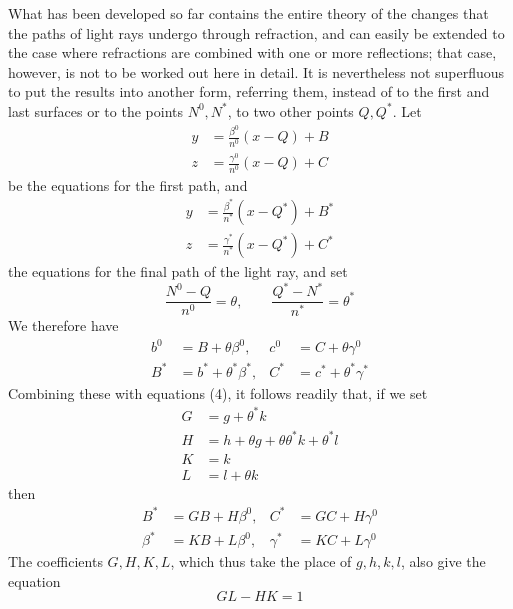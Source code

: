 What has been developed so far contains the entire theory of the changes that the paths of light rays undergo through refraction, and can easily be extended to the case where refractions are combined with one or more reflections; that case, however, is not to be worked out here in detail. It is nevertheless not superfluous to put the results into another form, referring them, instead of to the first and last surfaces or to the points $N^0,N^*$, to two other points $Q,Q^*$. Let
\[
\begin{aligned}
y&=\frac{\beta^0}{n^0}(x-Q)+B\\
z&=\frac{\gamma^0}{n^0}(x-Q)+C
\end{aligned}
\]
be the equations for the first path, and
\[
\begin{aligned}
y&=\frac{\beta^*}{n^*}(x-Q^*)+B^*\\
z&=\frac{\gamma^*}{n^*}(x-Q^*)+C^*
\end{aligned}
\]
the equations for the final path of the light ray, and set
\[
\frac{N^0-Q}{n^0}=\theta,\qquad \frac{Q^*-N^*}{n^*}=\theta^*
\]
We therefore have
\[
\begin{aligned}
b^0&=B+\theta\beta^0,&c^0&=C+\theta\gamma^0\\
B^*&=b^*+\theta^*\beta^*,&C^*&=c^*+\theta^*\gamma^*
\end{aligned}
\]
Combining these with equations (4), it follows readily that, if we set
\[
\begin{aligned}
G&=g+\theta^*k\\
H&=h+\theta g+\theta\theta^*k+\theta^*l\\
K&=k\\
L&=l+\theta k
\end{aligned}
\]
then
\[
\begin{aligned}
B^*&=GB+H\beta^0,&C^*&=GC+H\gamma^0\\
\beta^*&=KB+L\beta^0,&\gamma^*&=KC+L\gamma^0
\end{aligned}
\]
The coefficients $G,H,K,L$, which thus take the place of $g,h,k,l$, also give the equation
\[
GL-HK=1
\]

